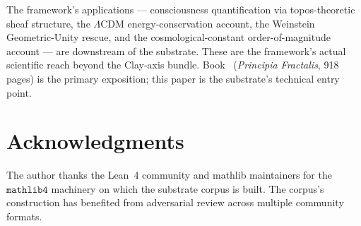 \documentclass[11pt,a4paper]{amsart}
\theoremstyle{plain}
\theoremstyle{definition}
\begin{document}
The framework's applications --- consciousness quantification via topos-theoretic sheaf structure, the $\Lambda$CDM energy-conservation account, the Weinstein Geometric-Unity rescue, and the cosmological-constant order-of-magnitude account --- are downstream of the substrate. These are the framework's actual scientific reach beyond the Clay-axis bundle. Book~\cite{cohen2026book} (\emph{Principia Fractalis}, 918 pages) is the primary exposition; this paper is the substrate's technical entry point.

\section*{Acknowledgments}

The author thanks the Lean~4 community and mathlib maintainers for the $\texttt{mathlib4}$ machinery on which the substrate corpus is built. The corpus's construction has benefited from adversarial review across multiple community formats.
\end{document}

